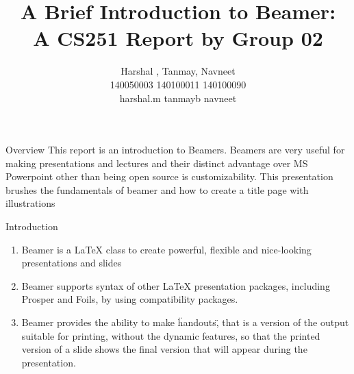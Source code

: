 \documentclass{beamer}
\title{A Brief Introduction to Beamer: \\A CS251 Report by Group 02}
\author{Harshal ,  Tanmay, \quad Navneet\\140050003  140100011  140100090\\ harshal.m \quad  tanmayb \quad navneet}
\institute{IITB}
\begin{document}
 \maketitle
 \begin{frame}{Overview}
 This report is an introduction to Beamers. Beamers are very useful for making presentations and lectures and their distinct advantage over MS Powerpoint other than  being open source is customizability.
 This presentation brushes the fundamentals of beamer and how to create a title page with illustrations
 \end{frame}
 
\begin{frame}{Introduction}
\begin{enumerate}
\item<1-> Beamer is a LaTeX class to create powerful, flexible and nice-looking presentations and slides\\
\item<2-> Beamer supports syntax of other LaTeX presentation packages, including Prosper and Foils, by using compatibility packages.\\
\item<3-> Beamer provides the ability to make \"handouts\", that is a version of the output suitable for printing, without the dynamic features, so that the printed version of a slide shows the final version that will appear during the presentation. \\
\end{enumerate}
\end{frame}
\end{document}
